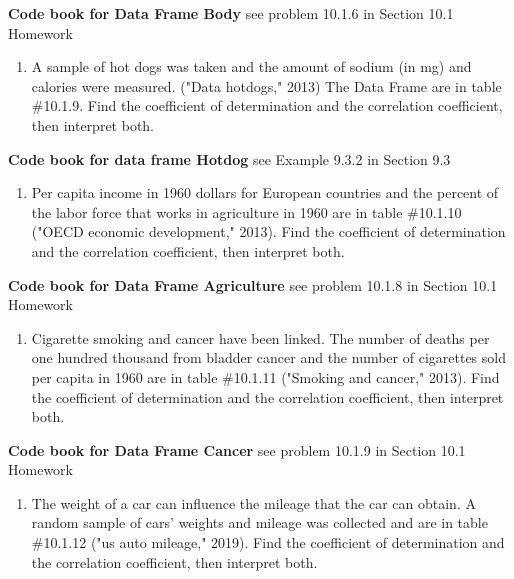 \documentclass[
]{book}
\providecommand{\tightlist}{%
  \setlength{\itemsep}{0pt}\setlength{\parskip}{0pt}}
\begin{document}
\textbf{Code book for Data Frame Body} see problem 10.1.6 in Section 10.1 Homework

\begin{enumerate}
\def\labelenumi{\arabic{enumi}.}
\setcounter{enumi}{6}
\tightlist
\item
  A sample of hot dogs was taken and the amount of sodium (in mg) and calories were measured. ("Data hotdogs," 2013) The Data Frame are in table \#10.1.9. Find the coefficient of determination and the correlation coefficient, then interpret both.
\end{enumerate}

\textbf{Code book for data frame Hotdog} see Example 9.3.2 in Section 9.3

\begin{enumerate}
\def\labelenumi{\arabic{enumi}.}
\setcounter{enumi}{7}
\tightlist
\item
  Per capita income in 1960 dollars for European countries and the percent of the labor force that works in agriculture in 1960 are in table \#10.1.10 ("OECD economic development," 2013). Find the coefficient of determination and the correlation coefficient, then interpret both.
\end{enumerate}

\textbf{Code book for Data Frame Agriculture} see problem 10.1.8 in Section 10.1 Homework

\begin{enumerate}
\def\labelenumi{\arabic{enumi}.}
\setcounter{enumi}{8}
\tightlist
\item
  Cigarette smoking and cancer have been linked. The number of deaths per one hundred thousand from bladder cancer and the number of cigarettes sold per capita in 1960 are in table \#10.1.11 ("Smoking and cancer," 2013). Find the coefficient of determination and the correlation coefficient, then interpret both.
\end{enumerate}

\textbf{Code book for Data Frame Cancer} see problem 10.1.9 in Section 10.1 Homework

\begin{enumerate}
\def\labelenumi{\arabic{enumi}.}
\setcounter{enumi}{9}
\tightlist
\item
  The weight of a car can influence the mileage that the car can obtain. A random sample of cars' weights and mileage was collected and are in table \#10.1.12 ("us auto mileage," 2019). Find the coefficient of determination and the correlation coefficient, then interpret both.
\end{enumerate}
\end{document}
